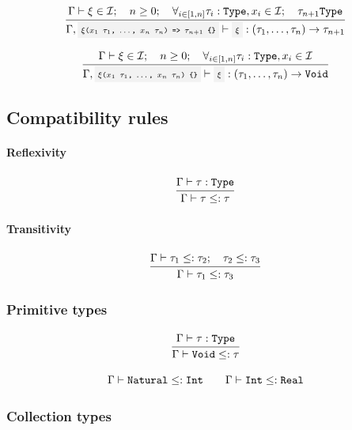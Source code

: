 \[
	\infrule{
		\EnvSym\then \xi \in \Id \semiq n \geq 0 \semiq \forall_{i\in[1,n]}{\tau_i:\Type,x_i\in\Id} \semiq \tau_{n+1}\Type
	}{
		\EnvSym,\code{$\xi$($x_1$ $\tau_1$, $\dotsc$, $x_n$ $\tau_n$) => $\tau_{n+1}$ \{\}} \then \code{$\xi$} : (\tau_1,\dotsc,\tau_n)\to\tau_{n+1}
	}
\]

\[
	\infrule{
		\EnvSym\then \xi \in \Id \semiq n \geq 0 \semiq \forall_{i\in[1,n]}{\tau_i:\Type,x_i\in\Id}
	}{
		\EnvSym,\code{$\xi$($x_1$ $\tau_1$, $\dotsc$, $x_n$ $\tau_n$) \{\}} \then \code{$\xi$} : (\tau_1,\dotsc,\tau_n)\to\Void
	}
\]



\subsection{Compatibility rules}


\paragraph{Reflexivity}
\label{par:compatibility_reflexivity}
\[
	\frac{\begin{gathered}
		\Gamma\vdash \tau:\texttt{Type}
	\end{gathered}}{\begin{gathered}
		\Gamma\vdash \tau \leq: \tau
	\end{gathered}}
\]

\paragraph{Transitivity}
\[
	\frac{\begin{gathered}
		\Gamma\vdash \tau_1 \leq: \tau_2 ;\quad \tau_2 \leq: \tau_3
	\end{gathered}}{\begin{gathered}
		\Gamma\vdash \tau_1 \leq: \tau_3
	\end{gathered}}
\]

\subsubsection{Primitive types}

\[
	\frac{\begin{gathered}
		\Gamma\vdash \tau : \texttt{Type}
	\end{gathered}}{\begin{gathered}
		\Gamma\vdash \texttt{Void} \leq: \tau
	\end{gathered}}
\]

\[
	\Gamma\vdash \texttt{Natural} \leq: \texttt{Int}
	\qquad \Gamma\vdash \texttt{Int} \leq: \texttt{Real}
\]

\subsubsection{Collection types}

